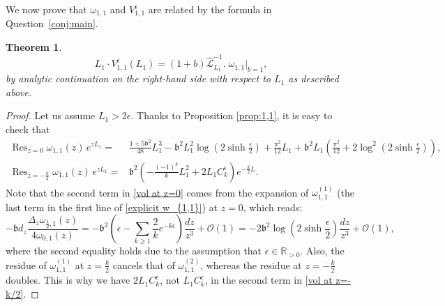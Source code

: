 \documentclass[12pt]{amsart}
\DeclareMathOperator*{\Res}{Res}
\theoremstyle{plain}
\newtheorem{theorem}{Theorem}[section]
\theoremstyle{definition}
\theoremstyle{remark}
\numberwithin{equation}{section}
\begin{document}
We now prove that $\omega_{1,1}$ and $V^\epsilon_{1,1}$ are related by the formula in Question~\ref{conj:main}.

\begin{theorem}\label{thm:1,1}
 \begin{equation}
     L_1\cdot V_{1,1}^\epsilon(L_1)= (1+b)\hat{\mathcal{L}}^{-1}_{L_1}.\;\omega_{1,1}\Big|_{b=1},
    \end{equation} 
    by analytic continuation on the right-hand side with respect to $L_1$ as described above.
\end{theorem}
\begin{proof}
Let us assume $L_1>2\epsilon$. Thanks to Proposition \ref{prop:1,1}, it is easy to check that
    \begin{align}
        \Res_{z=0}\omega_{1,1}(z)\,e^{z L_1}=&\frac{1+5\mathfrak{b}^2}{48}L_1^3-\mathfrak{b}^2L_1^2\log\left(2\sinh\frac{\epsilon}{2}\right)+\frac{\pi^2}{12}L_1+\mathfrak{b}^2L_1\left(\frac{\pi^2}{12}+2\log^2\left(2\sinh\frac{\epsilon}{2}\right)\right),\label{vol at z=0}\\
        \Res_{z=-\frac{k}{2}}\omega_{1,1}(z)\,e^{z L_1}=&\mathfrak{b}^2\left(-\frac{(-1)^k}{k}L_1^2+2L_1C_k^\epsilon \right)e^{-\frac{k}{2}L}.\label{vol at z=-k/2}
    \end{align}
Note that the second term in \eqref{vol at z=0} comes from the expansion of $\omega_{1,1}^{(1)}$ (the last term in the first line of \eqref{explicit w_{1,1}}) at $z=0$, which reads:
    \begin{equation*}
     -  \mathfrak{b}d_{z}\frac{\Delta_{z}\omega_{\frac12,1}(z)}{4\omega_{0,1}(z)}=-\mathfrak{b}^2 \left(\epsilon-\sum_{k\geq1}\frac{2}{k}e^{-k\epsilon}\right)\frac{dz}{z^3}+\mathcal{O}(1)=-2\mathfrak{b}^2\log\left(2\sinh\frac{\epsilon}{2}\right)\frac{dz}{z^3}+\mathcal{O}(1),
    \end{equation*}
where the second equality holds due to the assumption that $\epsilon\in\mathbb{R}_{>0}$. Also, the residue of $\omega_{1,1}^{(1)}$ at $z=\frac{k}{2}$ cancels that of $\omega_{1,1}^{(2)}$, whereas the residue at $z=-\frac{k}{2}$ doubles. This is why we have $2L_1C_k^\epsilon$, not $L_1C_k^\epsilon$, in the second term in \eqref{vol at z=-k/2}.


\end{proof}
\end{document}
